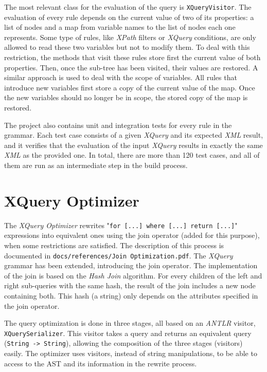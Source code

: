 \documentclass[paper=letter, fontsize=11pt]{scrartcl}
\begin{document}
The most relevant class for the evaluation of the query is \texttt{XQueryVisitor}.
The evaluation of every rule depends on the current value of two of its properties: a list of nodes and a map from variable names to the list of nodes each one represents.
Some type of rules, like \textit{XPath} filters or \textit{XQuery} conditions, are only allowed to read these two variables but not to modify them.
To deal with this restriction, the methods that visit these rules store first the current value of both properties.
Then, once the sub-tree has been visited, their values are restored.
A similar approach is used to deal with the scope of variables.
All rules that introduce new variables first store a copy of the current value of the map.
Once the new variables should no longer be in scope, the stored copy of the map is restored.

The project also contains unit and integration tests for every rule in the grammar.
Each test case consists of a given \textit{XQuery} and its expected \textit{XML} result, and it verifies that the evaluation of the input \textit{XQuery} results in exactly the same \textit{XML} as the provided one.
In total, there are more than 120 test cases, and all of them are run as an intermediate step in the build process.

\section{XQuery Optimizer}

The \textit{XQuery Optimizer} rewrites "\texttt{for [...] where [...] return [...]}" expressions into equivalent ones using the join operator (added for this purpose), when some restrictions are satisfied.
The description of this process is documented in \texttt{docs/references/Join Optimization.pdf}.
The \textit{XQuery} grammar has been extended, introducing the join operator.
The implementation of the join is based on the \textit{Hash Join} algorithm.
For every children of the left and right sub-queries with the same hash, the result of the join includes a new node containing both.
This hash (a string) only depends on the attributes specified in the join operator.

The query optimization is done in three stages, all based on an \textit{ANTLR} visitor, \texttt{XQuerySerializer}.
This visitor takes a query and returns an equivalent query (\texttt{String -> String}), allowing the composition of the three stages (visitors) easily.
The optimizer uses visitors, instead of string manipulations, to be able to access to the AST and its information in the rewrite process.
\end{document}
